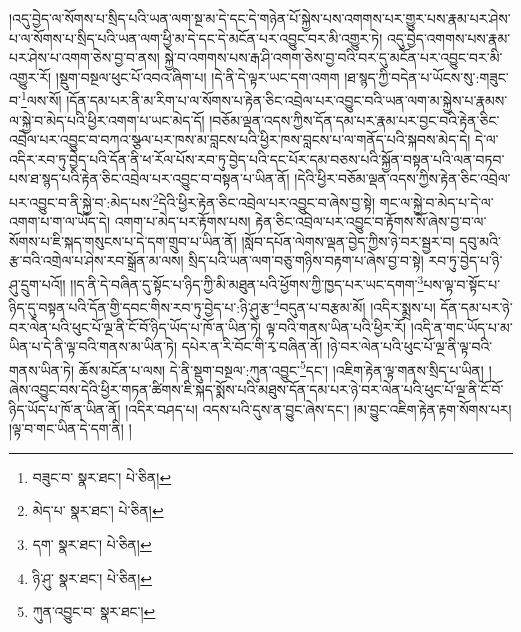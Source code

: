 །འདུ་བྱེད་ལ་སོགས་པ་སྲིད་པའི་ཡན་ལག་སྔ་མ་དེ་དང་དེ་གཉེན་པོ་སྐྱེས་པས་འགགས་པར་གྱུར་པས་རྣམ་པར་ཤེས་པ་ལ་སོགས་པ་སྲིད་པའི་ཡན་ལག་ཕྱི་མ་དེ་དང་དེ་མངོན་པར་འབྱུང་བར་མི་འགྱུར་ཏེ། འདུ་བྱེད་འགགས་པས་རྣམ་པར་ཤེས་པ་འགག་ཅེས་བྱ་བ་ནས། སྐྱེ་བ་འགགས་པས་རྒ་ཤི་འགག་ཅེས་བྱ་བའི་བར་དུ་མངོན་པར་འབྱུང་བར་མི་འགྱུར་རོ། །སྡུག་བསྔལ་ཕུང་པོ་འབའ་ཞིག་པ། །དེ་ནི་དེ་ལྟར་ཡང་དག་འགག །ཐ་སྙད་ཀྱི་བདེན་པ་ཡོངས་སུ་:གཟུང་བ་\footnote{བཟུང་བ་  སྣར་ཐང་།  པེ་ཅིན། }ལས་སོ། །དོན་དམ་པར་ནི་མ་རིག་པ་ལ་སོགས་པ་རྟེན་ཅིང་འབྲེལ་པར་འབྱུང་བའི་ཡན་ལག་མ་སྐྱེས་པ་རྣམས་ལ་སྐྱེ་བ་མེད་པའི་ཕྱིར་འགག་པ་ཡང་མེད་དོ། །བཅོམ་ལྡན་འདས་ཀྱིས་དོན་དམ་པར་རྣམ་པར་བྱང་བའི་རྟེན་ཅིང་འབྲེལ་པར་འབྱུང་བ་བཀའ་སྩལ་པར་ཁས་མ་བླངས་པའི་ཕྱིར་ཁས་བླངས་པ་ལ་གནོད་པའི་སྐབས་མེད་དེ། དེ་ལ་འདིར་རབ་ཏུ་བྱེད་པའི་དོན་ནི་ཕ་རོལ་པོས་རབ་ཏུ་བྱེད་པའི་དང་པོར་དམ་བཅས་པའི་སྐྱོན་བསྟན་པའི་ལན་བཏབ་པས་ཐ་སྙད་པའི་རྟེན་ཅིང་འབྲེལ་པར་འབྱུང་བ་བསྟན་པ་ཡིན་ནོ། །དེའི་ཕྱིར་བཅོམ་ལྡན་འདས་ཀྱིས་རྟེན་ཅིང་འབྲེལ་པར་འབྱུང་བ་ནི་སྐྱེ་བ་:མེད་པས་\footnote{མེད་པ་  སྣར་ཐང་།  པེ་ཅིན། }དེའི་ཕྱིར་རྟེན་ཅིང་འབྲེལ་པར་འབྱུང་བ་ཞེས་བྱ་སྟེ། གང་ལ་སྐྱེ་བ་མེད་པ་དེ་ལ་འགག་པ་ག་ལ་ཡོད་དེ། འགག་པ་མེད་པར་རྟོགས་པས། རྟེན་ཅིང་འབྲེལ་པར་འབྱུང་བ་རྟོགས་སོ་ཞེས་བྱ་བ་ལ་སོགས་པ་ཇི་སྐད་གསུངས་པ་དེ་དག་གྲུབ་པ་ཡིན་ནོ། །སློབ་དཔོན་ལེགས་ལྡན་བྱེད་ཀྱིས་ཉེ་བར་སྦྱར་བ། དབུ་མའི་རྩ་བའི་འགྲེལ་པ་ཤེས་རབ་སྒྲོན་མ་ལས། སྲིད་པའི་ཡན་ལག་བཅུ་གཉིས་བརྟག་པ་ཞེས་བྱ་བ་སྟེ། རབ་ཏུ་བྱེད་པ་ཉི་ཤུ་དྲུག་པའོ།། །།ད་ནི་དེ་བཞིན་དུ་སྟོང་པ་ཉིད་ཀྱི་མི་མཐུན་པའི་ཕྱོགས་ཀྱི་ཁྱད་པར་ཡང་དགག་\footnote{དག་  སྣར་ཐང་།  པེ་ཅིན། }པས་ལྟ་བ་སྟོང་པ་ཉིད་དུ་བསྟན་པའི་དོན་གྱི་དབང་གིས་རབ་ཏུ་བྱེད་པ་:ཉི་ཤུ་རྩ་\footnote{ཉི་ཤུ་  སྣར་ཐང་།  པེ་ཅིན། }བདུན་པ་བརྩམ་མོ། །འདིར་སྨྲས་པ། དོན་དམ་པར་ཉེ་བར་ལེན་པའི་ཕུང་པོ་ལྔ་ནི་ངོ་བོ་ཉིད་ཡོད་པ་ཁོ་ན་ཡིན་ཏེ། ལྟ་བའི་གནས་ཡིན་པའི་ཕྱིར་རོ། །འདི་ན་གང་ཡོད་པ་མ་ཡིན་པ་དེ་ནི་ལྟ་བའི་གནས་མ་ཡིན་ཏེ། དཔེར་ན་རི་བོང་གི་རྭ་བཞིན་ནོ། །ཉེ་བར་ལེན་པའི་ཕུང་པོ་ལྔ་ནི་ལྟ་བའི་གནས་ཡིན་ཏེ། ཆོས་མངོན་པ་ལས། དེ་ནི་སྡུག་བསྔལ་:ཀུན་འབྱུང་\footnote{ཀུན་འབྱུང་བ་  སྣར་ཐང་། }དང་། །འཇིག་རྟེན་ལྟ་གནས་སྲིད་པ་ཡིན། །ཞེས་འབྱུང་བས་དེའི་ཕྱིར་གཏན་ཚིགས་ཇི་སྐད་སྨོས་པའི་མཐུས་དོན་དམ་པར་ཉེ་བར་ལེན་པའི་ཕུང་པོ་ལྔ་ནི་ངོ་བོ་ཉིད་ཡོད་པ་ཁོ་ན་ཡིན་ནོ། །འདིར་བཤད་པ། འདས་པའི་དུས་ན་བྱུང་ཞེས་དང་། །མ་བྱུང་འཇིག་རྟེན་རྟག་སོགས་པར། །ལྟ་བ་གང་ཡིན་དེ་དག་ནི། །
